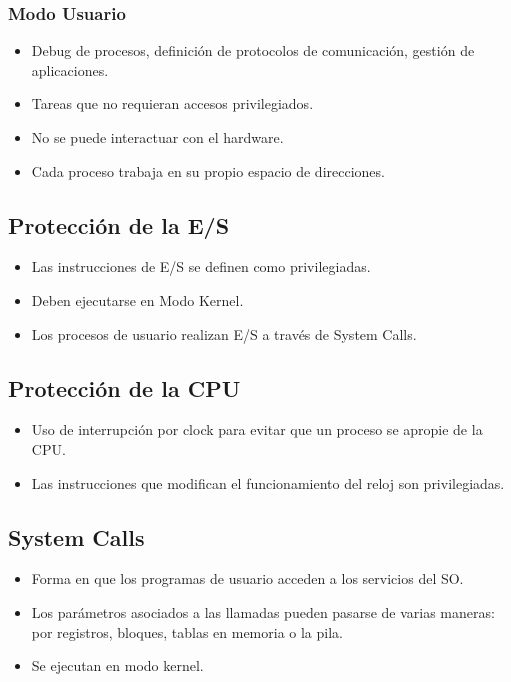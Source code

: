 \subsubsection{Modo Usuario}
\begin{itemize}
    \item Debug de procesos, definición de protocolos de comunicación, gestión de aplicaciones.
    \item Tareas que no requieran accesos privilegiados.
    \item No se puede interactuar con el hardware.
    \item Cada proceso trabaja en su propio espacio de direcciones.
\end{itemize}

\subsection{Protección de la E/S}
\begin{itemize}
    \item Las instrucciones de E/S se definen como privilegiadas.
    \item Deben ejecutarse en Modo Kernel.
    \item Los procesos de usuario realizan E/S a través de System Calls.
\end{itemize}

\subsection{Protección de la CPU}
\begin{itemize}
    \item Uso de interrupción por clock para evitar que un proceso se apropie de la CPU.
    \item Las instrucciones que modifican el funcionamiento del reloj son privilegiadas.
\end{itemize}

\subsection{System Calls}
\begin{itemize}
    \item Forma en que los programas de usuario acceden a los servicios del SO.
    \item Los parámetros asociados a las llamadas pueden pasarse de varias maneras: por registros, bloques, tablas en memoria o la pila.
    \item Se ejecutan en modo kernel.
\end{itemize}
